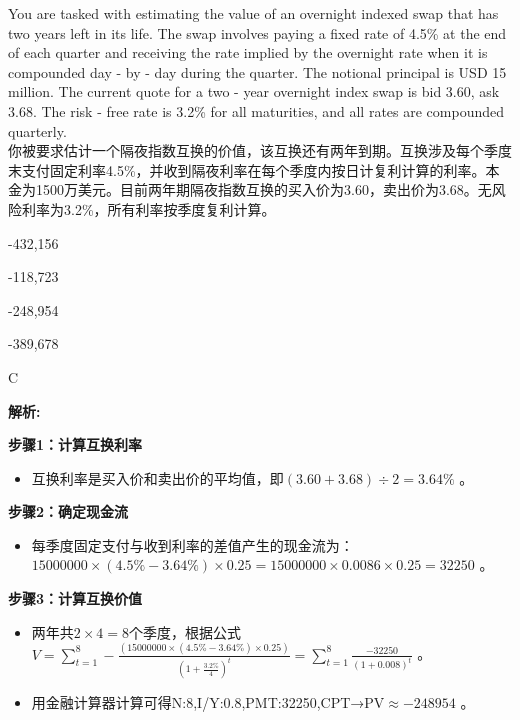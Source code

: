 \documentclass{article}
\newcounter{question} %
\newenvironment{explanation}
{\textbf{解析:}\par}
{\par}
\begin{document}
\begin{question}
    You are tasked with estimating the value of an overnight indexed swap that has two years left in its life. The swap involves paying a fixed rate of 4.5\% at the end of each quarter and receiving the rate implied by the overnight rate when it is compounded day - by - day during the quarter. The notional principal is USD 15 million. The current quote for a two - year overnight index swap is bid 3.60, ask 3.68. The risk - free rate is 3.2\% for all maturities, and all rates are compounded quarterly.
    \\你被要求估计一个隔夜指数互换的价值，该互换还有两年到期。互换涉及每个季度末支付固定利率4.5\%，并收到隔夜利率在每个季度内按日计复利计算的利率。本金为1500万美元。目前两年期隔夜指数互换的买入价为3.60，卖出价为3.68。无风险利率为3.2\%，所有利率按季度复利计算。
    \end{question}
    
    \begin{choices}
        \item -432,156
        \item -118,723
        \item -248,954
        \item -389,678
    \end{choices}
    
    \begin{correctanswer}
        C
    \end{correctanswer}
    
    \begin{explanation}
    \textbf{步骤1：计算互换利率}
    \begin{itemize}
    \item 互换利率是买入价和卖出价的平均值，即\((3.60 + 3.68)\div2 = 3.64\%\) 。
    \end{itemize}
    \textbf{步骤2：确定现金流}
    \begin{itemize}
    \item 每季度固定支付与收到利率的差值产生的现金流为：\(15000000\times(4.5\% - 3.64\%)\times0.25=15000000\times0.0086\times0.25 = 32250\) 。
    \end{itemize}
    \textbf{步骤3：计算互换价值}
    \begin{itemize}
    \item 两年共\(2\times4 = 8\)个季度，根据公式\(V=\sum_{t = 1}^{8}-\frac{(15000000\times(4.5\% - 3.64\%)\times0.25)}{(1+\frac{3.2\%}{4})^{t}}=\sum_{t = 1}^{8}\frac{- 32250}{(1 + 0.008)^{t}}\) 。
    \item 用金融计算器计算可得N:8,I/Y:0.8,PMT:32250,CPT→PV\(\approx - 248954\) 。 
    \end{itemize}
    \end{explanation}
    
\end{document}
